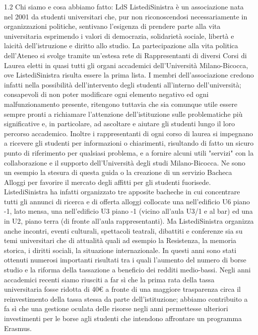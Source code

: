 1.2 Chi siamo e cosa abbiamo fatto: LdS
ListediSinistra è un associazione nata nel 2001 da studenti universitari che, pur non riconoscendosi necessariamente in organizzazioni politiche, sentivano l'esigenza di prendere parte alla vita universitaria esprimendo i valori di democrazia, solidarietà sociale, libertà e laicità dell'istruzione e diritto allo studio.
La partecipazione alla vita politica dell'Ateneo si svolge tramite un'estesa rete di Rappresentanti di diversi Corsi di Laurea eletti in quasi tutti gli organi accademici dell'Università Milano-Bicocca, ove ListediSinistra risulta essere la prima lista. I membri dell'associazione credono infatti nella possibilità dell'intervento degli studenti all'interno dell'università; consapevoli di non poter modificare ogni elemento negativo ed ogni malfunzionamento presente, ritengono tuttavia che sia comunque utile essere sempre pronti a richiamare l'attenzione dell'istituzione sulle problematiche più significative e, in particolare, ad ascoltare e aiutare gli studenti lungo il loro percorso accademico.
Inoltre i rappresentanti di ogni corso di laurea si impegnano a ricevere gli studenti per informazioni o chiarimenti, risultando di fatto un sicuro punto di riferimento per qualsiasi problema, e a fornire alcuni utili "servizi" con la collaborazione e il supporto dell'Università degli studi Milano-Bicocca. Ne sono un esempio la stesura di questa guida o la creazione di un servizio Bacheca Alloggi per favorire il mercato degli affitti per gli studenti fuorisede.
ListediSinistra ha infatti organizzato tre apposite bacheche in cui concentrare tutti gli annunci di ricerca e di offerta alloggi collocate una nell'edificio U6 piano -1, lato mensa, una nell'edificio U3 piano -1 (vicino all'aula U3/1 e al bar) ed una in U2, piano terra (di fronte all’aula rappresentanti). Ma ListediSinistra organizza anche incontri, eventi culturali, spettacoli teatrali, dibattiti e conferenze sia su temi universitari che di attualità quali ad esempio la Resistenza, la memoria storica, i diritti sociali, la situazione internazionale.
In questi anni sono stati ottenuti numerosi importanti risultati tra i quali l'aumento del numero di borse studio e la riforma della tassazione a beneficio dei redditi medio-bassi. Negli anni accademici recenti siamo riusciti a far sì che la prima rata della tassa universitaria fosse ridotta di 40€ a fronte di una maggiore trasparenza circa il reinvestimento della tassa stessa da parte dell'istituzione; abbiamo contribuito a fa sì che una gestione oculata delle risorse negli anni permettesse ulteriori investimenti per le borse agli studenti che intendono affrontare un programma Erasmus.
